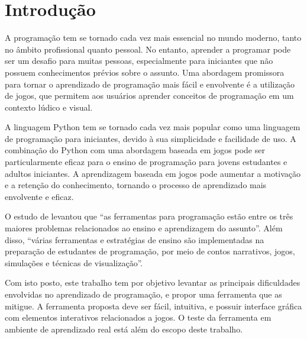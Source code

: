 \chapter[Introdução]{Introdução}

A programação tem se tornado cada vez mais essencial no mundo moderno, tanto no âmbito profissional quanto pessoal. No entanto, aprender a programar pode ser um desafio para muitas pessoas, especialmente para iniciantes que não possuem conhecimentos prévios sobre o assunto. Uma abordagem promissora para tornar o aprendizado de programação mais fácil e envolvente é a utilização de jogos, que permitem aos usuários aprender conceitos de programação em um contexto lúdico e visual.

A linguagem Python tem se tornado cada vez mais popular como uma linguagem de programação para iniciantes, devido à sua simplicidade e facilidade de uso. A combinação do Python com uma abordagem baseada em jogos pode ser particularmente eficaz para o ensino de programação para jovens estudantes e adultos iniciantes. A aprendizagem baseada em jogos pode aumentar a motivação e a retenção do conhecimento, tornando o processo de aprendizado mais envolvente e eficaz.

O estudo de  levantou que ``as ferramentas para programação estão entre os três maiores problemas relacionados ao ensino e aprendizagem do assunto''. Além disso, ``várias ferramentas e estratégias de ensino são implementadas na preparação de estudantes de programação, por meio de contos narrativos, jogos, simulações e técnicas de visualização''.

Com isto posto, este trabalho tem por objetivo levantar as principais dificuldades envolvidas no aprendizado de programação, e propor uma ferramenta que as mitigue. A ferramenta proposta deve ser fácil, intuitiva, e possuir interface gráfica com elementos interativos relacionados a jogos. O teste da ferramenta em ambiente de aprendizado real está além do escopo deste trabalho.